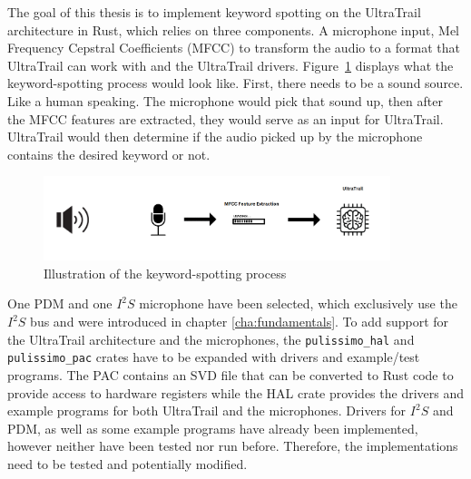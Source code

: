 
The goal of this thesis is to implement keyword spotting on the UltraTrail architecture in Rust,
which relies on three components.
A microphone input, Mel Frequency Cepstral Coefficients (MFCC) \cite[Cha 2.5]{rust_pulp} to transform the audio to
a format that UltraTrail can work with and the UltraTrail drivers.
Figure~\ref{fig:pipeline} displays what the keyword-spotting process would look like.
First, there needs to be a sound source. Like a human speaking.
The microphone would pick that sound up, then after the MFCC features are extracted, they would serve
as an input for UltraTrail. UltraTrail would then determine if the audio picked up by the microphone
contains the desired keyword or not.

\begin{figure}[H]
    \centering
    \includegraphics[width=0.9\textwidth]{figures/pipeline.png}
    \caption[Illustration of the keyword-spotting process]{Illustration of the keyword-spotting process}
    \label{fig:pipeline}
\end{figure}

One PDM and one $I^2S$ microphone have been selected, which exclusively use the $I^2S$ bus and were introduced
in chapter \ref{cha:fundamentals}.
To add support for the UltraTrail architecture and the microphones, the \lstinline{pulissimo_hal}
and \lstinline{pulissimo_pac} crates have to be expanded with drivers and example/test programs.
The PAC contains an SVD file that can be converted to Rust code to provide access to hardware registers
while the HAL crate provides the drivers and example programs for both UltraTrail and the microphones.
Drivers for $I^2S$ and PDM, as well as some example programs have already been implemented,
however neither have been tested nor run before.
Therefore, the implementations need to be tested and potentially modified.


